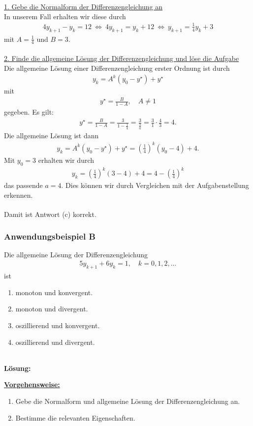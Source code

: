 \underline{1. Gebe die Normalform der Differenzengleichung an}\\
In unserem Fall erhalten wir diese durch
\begin{align*}
4 y_{k+1} -y_k = 12 \ 
\Leftrightarrow \
4 y_{k+1} = y_k + 12
\ \Leftrightarrow \
y_{k+1} = \frac{1}{4} y_k + 3
\end{align*}
mit $A = \frac{1}{4} $ und $B = 3$.\\
\\
\underline{2. Finde die allgemeine Lösung der Differenzengleichung und löse die Aufgabe}\\
Die allgemeine Lösung einer Differenzengleichung erster Ordnung ist durch
\begin{align*}
y_k = A^k (y_0 - y^\star)  + y^\star
\end{align*}
mit
\begin{align*}
y^\star 
= \frac{B}{1 -A }, \quad A \neq 1 
\end{align*}
gegeben.
Es gilt:
\begin{align*}
y^\star 
= \frac{B}{1 -A }
= \frac{3}{1 - \frac{1}{4} }
= \frac{3}{\frac{3}{4}}
= \frac{3}{1} \cdot \frac{4}{3} = 4.
\end{align*}
Die allgemeine Lösung ist dann
\begin{align*}
y_k = A^k (y_0 - y^\star)  + y^\star
=
\left( \frac{1}{4} \right)^k(y_0 -4) +4.
\end{align*}
Mit $y_0 = 3$ erhalten wir durch
\begin{align*}
y_k = \left( \frac{1}{4} \right)^k ( 3 - 4 ) +4
=  4 - \left( \frac{1}{4} \right)^k
\end{align*}
das passende $a = 4$.
Dies können wir durch Vergleichen mit der Aufgabenstellung erkennen.\\
\\
Damit ist Antwort (c) korrekt.

\newpage
\subsubsection*{Anwendungsbeispiel B}
Die allgemeine Lösung der Differenzengleichung
\begin{align*}
5 y_{k+1} + 6 y_k = 1 , \quad k = 0,1,2,...
\end{align*}
ist
\renewcommand{\labelenumi}{(\alph{enumi})}
\begin{enumerate}
\item 
monoton und konvergent.
\item
monoton und divergent.
\item
oszillierend und konvergent.
\item
oszillierend und divergent.
\end{enumerate}
\ \\
\textbf{Lösung:}
\begin{mdframed}
\underline{\textbf{Vorgehensweise:}}
\renewcommand{\labelenumi}{\theenumi.}
\begin{enumerate}
\item Gebe die Normalform und allgemeine Lösung der Differenzengleichung an.
\item 
Bestimme die relevanten Eigenschaften.
\end{enumerate}
\end{mdframed}

